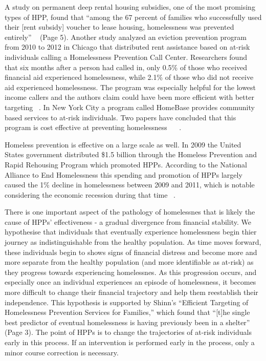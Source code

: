 \documentclass[10pt,letterpaper]{article}
\begin{document}
A study on permanent deep rental housing subsidies, one of the most promising types of HPP, found that ``among the 67 percent of families who successfully used their [rent subsidy] voucher to lease housing, homelessness was prevented entirely'' ~\cite{shinn2019homelessness} (Page 5). Another study analyzed an eviction prevention program from 2010 to 2012 in Chicago that distributed rent assistance based on at-risk individuals calling a Homelessness Prevention Call Center. Researchers found that six months after a person had called in, only 0.5\% of those who received financial aid experienced homelessness, while 2.1\% of those who did not receive aid experienced homelessness. The program was especially helpful for the lowest income callers and the authors claim could have been more efficient with better targeting ~\cite{evans2016impact}. In New York City a program called HomeBase provides community based services to at-risk individuals. Two papers have concluded that this program is cost effective at preventing homelessness ~\cite{rolston2013evaluation} ~\cite{goodman2016homelessness}. 

Homeless prevention is effective on a large scale as well. In 2009 the United States government distributed \$1.5 billion through the Homeless Prevention and Rapid Rehousing Program which promoted HPPs. According to the National Alliance to End Homelessness this spending and promotion of HPPs largely caused the 1\% decline in homelessness between 2009 and 2011, which is notable considering the economic recession during that time ~\cite{shinn2013efficient}.

There is one important aspect of the pathology of homelessnes that is likely the cause of HPPs' effectiveness - a gradual divergence from financial stability. We hypothesise that individuals that eventually experience homelessness begin thier journey as indistinguishable from the healthy population. As time moves forward, these individuals begin to shows signs of financial distress and become more and more separate from the healthy population (and more identifiable as at-risk) as they progress towards experiencing homelessnes. As this progression occurs, and especially once an individual experiences an episode of homelessness, it becomes more difficult to change their financial trajectory and help them reestablish their independence. This hypothesis is supported by Shinn's ``Efficient Targeting of Homelessness Prevention Services for Families,'' which found that ``[t]he single best predictor of eventual homelessness is having previously been in a shelter'' ~\cite{shinn2019homelessness} (Page 3). The point of HPPs is to change the trajectories of at-risk individuals early in this process. If an intervention is performed early in the process, only a minor course correction is necessary. 
\end{document}
